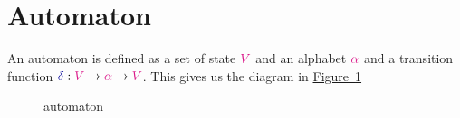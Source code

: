 \documentclass[twoside,11pt,openright]{report}
\theoremstyle{plain} %
\theoremstyle{definition}
\theoremstyle{remark}
\newcommand*{\figref}[1]{\hyperref[fig:#1]{Figure~\ref*{fig:#1}}}
\newcommand*{\type}[1]{\textcolor{magenta!90!black}{#1}}
\newcommand*{\function}[1]{\textcolor{blue!60!black}{\ensuremath{\mathtt{#1}}}}
\begin{document}
\section{Automaton}
An automaton is defined as a set of state \(\type{V}\) and an alphabet \(\type{\alpha}\) and a transition function \(\function{\delta} : \type{V} \rightarrow \type{\alpha} \rightarrow \type{V}\). This gives us the diagram in \figref{automaton}
\begin{figure}[h]
  \centering
  \caption{automaton}
  \label{fig:automaton}
\end{figure}
\end{document}
